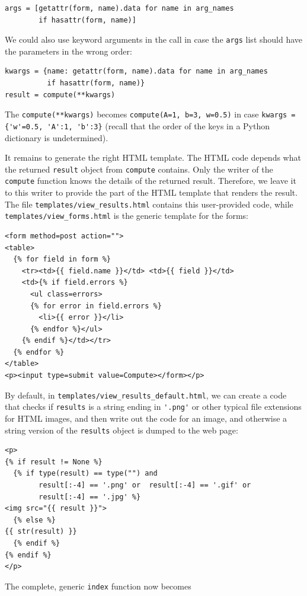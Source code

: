 \documentclass[%
oneside,                 %
final,                   %
10pt]{article}
\begin{document}
\begin{Verbatim}[numbers=none,fontsize=\fontsize{9pt}{9pt},baselinestretch=0.85]
args = [getattr(form, name).data for name in arg_names
        if hasattr(form, name)]
\end{Verbatim}
We could also use keyword arguments in the call in case
the \Verb!args! list should have the parameters in the wrong order:

\begin{Verbatim}[numbers=none,fontsize=\fontsize{9pt}{9pt},baselinestretch=0.85]
kwargs = {name: getattr(form, name).data for name in arg_names
          if hasattr(form, name)}
result = compute(**kwargs)
\end{Verbatim}
The \Verb!compute(**kwargs)! becomes \Verb!compute(A=1, b=3, w=0.5)!
in case \Verb!kwargs = {'w'=0.5, 'A':1, 'b':3}! (recall that the order of
the keys in a Python dictionary is undetermined).

It remains to generate the right HTML template. The HTML code depends
what the returned \Verb!result! object from \Verb!compute! contains. Only the
writer of the \Verb!compute! function knows the details of the returned
result. Therefore, we leave it to this writer to provide the part
of the HTML template that renders the result. The file \Verb!templates/view_results.html! contains this user-provided code, while \Verb!templates/view_forms.html!
is the generic template for the forms:

\begin{Verbatim}[numbers=none,fontsize=\fontsize{9pt}{9pt},baselinestretch=0.85]
<form method=post action="">
<table>
  {% for field in form %}
    <tr><td>{{ field.name }}</td> <td>{{ field }}</td>
    <td>{% if field.errors %}
      <ul class=errors>
      {% for error in field.errors %}
        <li>{{ error }}</li>
      {% endfor %}</ul>
    {% endif %}</td></tr>
  {% endfor %}
</table>
<p><input type=submit value=Compute></form></p>
\end{Verbatim}

By default, in \Verb!templates/view_results_default.html!, we can
create a code that checks if \Verb!results! is a string ending in \Verb!'.png'!
or other typical file extensions for HTML images, and then write out
the code for an image, and otherwise a string version of the \Verb!results!
object is dumped to the web page:

\begin{Verbatim}[numbers=none,fontsize=\fontsize{9pt}{9pt},baselinestretch=0.85]
<p>
{% if result != None %}
  {% if type(result) == type("") and
        result[:-4] == '.png' or  result[:-4] == '.gif' or
        result[:-4] == '.jpg' %}
<img src="{{ result }}">
  {% else %}
{{ str(result) }}
  {% endif %}
{% endif %}
</p>
\end{Verbatim}
The complete, generic \Verb!index! function now becomes
\end{document}
